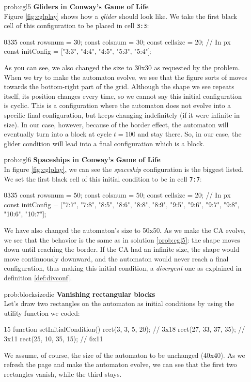 \begin{sol}{prob:cgl5}
\textbf{Gliders in Conway's Game of Life}\\
Figure \ref{fig:cglplay} shows how a \textit{glider} should look like.  We take
the first black cell of this configuration to be placed in cell \texttt{3:3}:
\begin{codeh2}{0}{3}{3}{5}
const rowsnum = 30;
const colsnum = 30;
const cellsize = 20; // In px
const initConfig = ["3:3", "4:4", "4:5", "5:3", "5:4"];
\end{codeh2}
As you can see, we also changed the size to 30x30 as requested by the problem.
When we try to make the automaton evolve, we see that the figure sorts of moves towards the bottom-right
part of the grid. Although the shape we see repeats itself, its position changes every time,
so we cannot say this initial configuration is cyclic. This is a configuration where the automaton does
not evolve into a specific final configuration, but keeps changing indefinitely (if it were infinite in size).
In our case, however, because of the border effect, the automaton will eventually turn into a block at cycle
$t=100$ and stay there. So, in our case, the glider condition will lead into a final configuration which is
a block.
\end{sol}

\begin{sol}{prob:cgl6}
\textbf{Spaceships in Conway's Game of Life}\\
In figure \ref{fig:cglplay}, we can see the \textit{spaceship} configuration is the biggest listed.
We set the first black cell of this initial condition to be in cell \texttt{7:7}:
\begin{codeh2}{0}{3}{3}{5}
const rowsnum = 50;
const colsnum = 50;
const cellsize = 20; // In px
const initConfig = ["7:7", "7:8", "8:5", "8:6", "8:8", "8:9", "9:5", "9:6", "9:7", "9:8", "10:6", "10:7"];
\end{codeh2}
We have also changed the automaton's size to 50x50.
As we make the CA evolve, we see that the behavior is the same as in solution \ref{prob:cgl5}: the shape
moves down until reaching the border. If the CA had an infinite size, the shape would move continuously
downward, and the automaton would never reach a final configuration, thus making this initial condition, a
\textit{divergent} one as explained in definition \ref{def:divconf}.
\end{sol}

\begin{sol}{prob:blocksizedie}
\textbf{Vanishing rectangular blocks}\\
Let's draw two rectangles on the automaton as initial conditions by using the utility function we coded:
\begin{codeh1}{1}{5}
function setInitialCondition() {
  rect(3, 3, 5, 20); // 3x18
  rect(27, 33, 37, 35); // 3x11
  rect(25, 10, 35, 15); // 6x11
}
\end{codeh1}
We assume, of course, the size of the automaton to be unchanged (40x40). As we refresh the page and make the 
automaton evolve, we can see that the first two rectangles vanish, while the third stays.
\end{sol}

